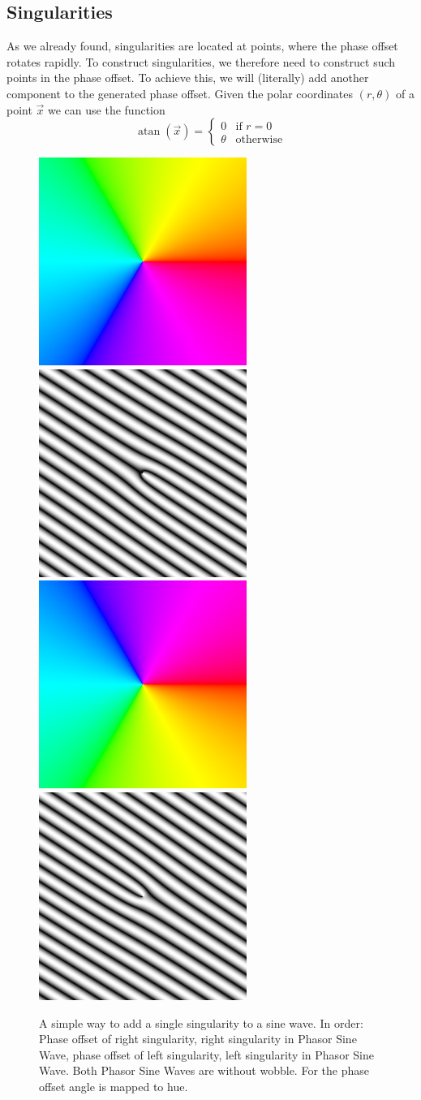 \documentclass{utue} %
\DeclareMathOperator{\atan}{atan}
\begin{document}
\subsection{Singularities}\label{sec:singularities}
As we already found, singularities are located at points, where the phase offset rotates rapidly. To construct singularities, we therefore need to construct such points in the phase offset. To achieve this, we will (literally) add another component to the generated phase offset. Given the polar coordinates $(r, \theta)$ of a point $\vec{x}$ we can use the function
$$
\atan(\vec{x}) = \begin{cases}
  0 & \text{if } r = 0\\
  \theta &\text{otherwise}
\end{cases}
$$

\begin{figure}[ht]
  \centering
  \includegraphics[width=0.235\linewidth]{images/rightSingularityPhase}
  \includegraphics[width=0.235\linewidth]{images/rightSingularity}
  \hfill
  \includegraphics[width=0.235\linewidth]{images/leftSingularityPhase}
  \includegraphics[width=0.235\linewidth]{images/leftSingularity}
  \caption{A simple way to add a single singularity to a sine wave. In order: Phase offset of right singularity, right singularity in Phasor Sine Wave, phase offset of left singularity, left singularity in Phasor Sine Wave. Both Phasor Sine Waves are without wobble. For the phase offset angle is mapped to hue.}\label{fig:singularities}
\end{figure}
\end{document}
